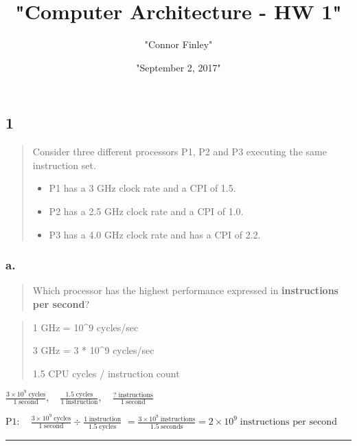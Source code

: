 \documentclass[]{article}
\title{"Computer Architecture - HW 1"}
\author{"Connor Finley"}
\date{"September 2, 2017"}
\begin{document}
\maketitle

\subsection{1}\label{header-n4699}

\begin{quote}
Consider three different processors P1, P2 and P3 executing the same
instruction set.

\begin{itemize}
\item
  P1 has a 3 GHz clock rate and a CPI of 1.5.
\item
  P2 has a 2.5 GHz clock rate and a CPI of 1.0.
\item
  P3 has a 4.0 GHz clock rate and has a CPI of 2.2.
\end{itemize}
\end{quote}

\subsubsection{a.}\label{header-n4713}

\begin{quote}
Which processor has the highest performance expressed in
\textbf{instructions per second}?
\end{quote}

\begin{quote}
1 GHz = 10\^{}9 cycles/sec

3 GHz = 3 * 10\^{}9 cycles/sec

1.5 CPU cycles / instruction count
\end{quote}

\(\frac{3 \times 10^9 \;\text{cycles}}{1 \;\text{second}}, \quad \frac{1.5 \; \text{cycles}}{1  \; \text{instruction}}, \quad \frac{\text{? instructions}}{1 \; \text{second}}\)

\(\text{P1}: \quad \frac{3 \times 10^9 \;\text{cycles}}{1 \;\text{second}} \div \frac{1  \; \text{instruction}}{1.5 \; \text{cycles}}\)
\(= \frac{3 \times 10^9 \; \text{instructions}}{1.5 \; \text{seconds}} = 2 \times 10^9 \; \text{instructions per second}\)

\begin{center}\rule{0.5\linewidth}{\linethickness}\end{center}
\end{document}
